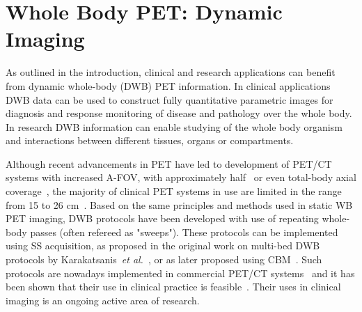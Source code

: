 \section{Whole Body PET: Dynamic Imaging}
As outlined in the introduction, clinical and research applications can benefit from dynamic whole-body (DWB) PET information. In clinical applications DWB data can be used to construct fully quantitative parametric images for diagnosis and response monitoring of disease and pathology over the whole body. In research DWB information can enable studying of the whole body organism and interactions between different tissues, organs or compartments. 

Although recent advancements in PET have led to development of PET/CT systems with increased A-FOV, with approximately half~\cite{Karp2020,Siegel2020} or even total-body axial coverage~\cite{Cherry2018}, the majority of clinical PET systems in use are limited in the range from 15 to 26 cm~\cite{Vandenberghe2020}. 
Based on the same principles and methods used in static WB PET imaging, DWB protocols have been developed with use of repeating whole-body passes (often refereed as "sweeps"). 
These protocols can be implemented using SS acquisition, as proposed in the original work on multi-bed DWB protocols by Karakatsanis~\textit{et al.}~\cite{Karakatsanis2011,Karakatsanis2013}, or as later proposed using CBM~\cite{Karakatsanis2016a,Hu2020}. Such protocols are nowadays implemented in commercial PET/CT systems~\cite{Hu2020} and it has been shown that their use in clinical practice is feasible~\cite{Fahrni2019,Dias2020}.  Their uses in clinical imaging is an ongoing active area of research.%

